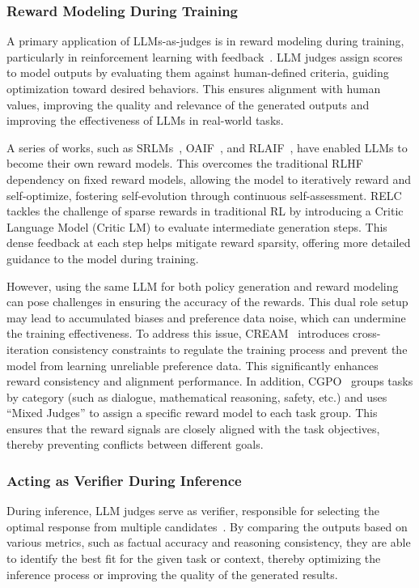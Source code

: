 \subsubsection{Reward Modeling During Training}
\label{sec: Reward Modeling During Training}

A primary application of LLMs-as-judges is in reward modeling during training, particularly in reinforcement learning with feedback~\cite{yuan2024self,guo2024direct,wang2024cream,xu2024perfect,cao2024enhancing}. LLM judges assign scores to model outputs by evaluating them against human-defined criteria, guiding optimization toward desired behaviors. This ensures alignment with human values, improving the quality and relevance of the generated outputs and improving the effectiveness of LLMs in real-world tasks.


A series of works, such as SRLMs~\cite{yuan2024self}, OAIF~\cite{guo2024direct}, and RLAIF~\cite{lee2023rlaif}, have enabled LLMs to become their own reward models. This overcomes the traditional RLHF dependency on fixed reward models, allowing the model to iteratively reward and self-optimize, fostering self-evolution through continuous self-assessment.
RELC~\cite{cao2024enhancing} tackles the challenge of sparse rewards in traditional RL by introducing a Critic Language Model (Critic LM) to evaluate intermediate generation steps. This dense feedback at each step helps mitigate reward sparsity, offering more detailed guidance to the model during training.

However, using the same LLM for both policy generation and reward modeling can pose challenges in ensuring the accuracy of the rewards. This dual role setup may lead to accumulated biases and preference data noise, which can undermine the training effectiveness. To address this issue, CREAM~\cite{wang2024cream} introduces cross-iteration consistency constraints to regulate the training process and prevent the model from learning unreliable preference data. This significantly enhances reward consistency and alignment performance. In addition, CGPO~\cite{xu2024perfect} groups tasks by category (such as dialogue, mathematical reasoning, safety, etc.) and uses ``Mixed Judges'' to assign a specific reward model to each task group. This ensures that the reward signals are closely aligned with the task objectives, thereby preventing conflicts between different goals.





\subsubsection{Acting as Verifier During Inference}
\label{sec: Acting as Verifier During Inference}
During inference, LLM judges serve as verifier, responsible for selecting the optimal response from multiple candidates~\cite{yao2024tree,besta2024graph,lightman2023let,musolesi2024creative,besta2024graph}. By comparing the outputs based on various metrics, such as factual accuracy and reasoning consistency, they are able to identify the best fit for the given task or context, thereby optimizing the inference process or improving the quality of the generated results.


